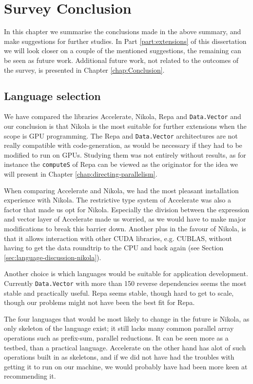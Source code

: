 \chapter{Survey Conclusion}
In this chapter we summarise the conclusions made in the above
summary, and make suggestions for further studies. In Part
\ref{part:extensions} of this dissertation we will look closer on a
couple of the mentioned suggestions, the remaining can be seen as
future work. Additional future work, not related to the outcomes of
the survey, is presented in Chapter \ref{chap:Conclusion}.

\section{Language selection}
We have compared the libraries Accelerate, Nikola, Repa and
\texttt{Data.Vector} and our conclusion is that Nikola is the most
suitable for further extensions when the scope is GPU programming. The
Repa and \texttt{Data.Vector} architectures are not really compatible
with code-generation, as would be necessary if they had to be modified
to run on GPUs. Studying them was not entirely without results, as for
instance the \texttt{computeS} of Repa can be viewed as the originator
for the idea we will present in Chapter
\ref{chap:directing-parallelism}.

When comparing Accelerate and Nikola, we had the most pleasant
installation experience with Nikola. The restrictive type system of
Accelerate was also a factor that made us opt for Nikola. Especially
the division between the expression and vector layer of Accelerate
made us worried, as we would have to make major modifications to break
this barrier down. Another plus in the favour of Nikola, is that it
allows interaction with other CUDA libraries, e.g. CUBLAS, without
having to get the data roundtrip to the CPU and back again (see
Section \ref{sec:language-discussion-nikola}).

Another choice is which languages would be suitable for application
development. Currently \texttt{Data.Vector} with more than 150 reverse
dependencies seems the most stable and practically useful. Repa seems
stable, though hard to get to scale, though our problems might not
have been the best fit for Repa.

The four languages that would be most likely to change in the future
is Nikola, as only skeleton of the language exist; it still lacks many
common parallel array operations such as prefix-sum, parallel
reductions. It can be seen more as a testbed, than a practical
language. Accelerate on the other hand has alot of such operations
built in as skeletons, and if we did not have had the troubles with
getting it to run on our machine, we would probably have had been more
keen at recommending it.

